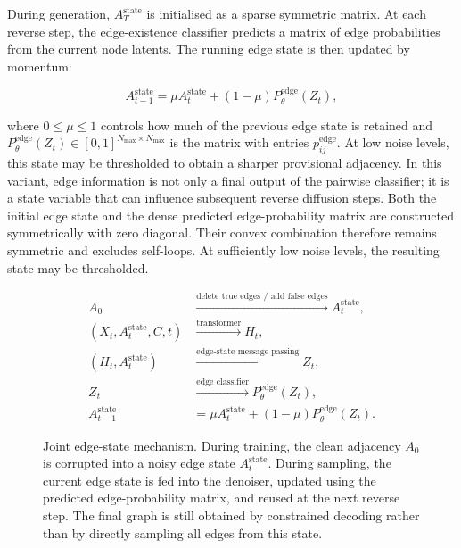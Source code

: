 During generation, \(A_T^{\mathrm{state}}\) is initialised as a sparse symmetric
matrix. At each reverse step, the edge-existence classifier predicts a matrix
of edge probabilities from the current node latents. The running edge state is
then updated by momentum:

\[
    A_{t-1}^{\mathrm{state}}
    =
    \mu A_t^{\mathrm{state}} +
    (1-\mu) P_\theta^{\mathrm{edge}}(Z_t),
\]

where \(0\leq\mu\leq1\) controls how much of the previous edge state is retained
and \(P_\theta^{\mathrm{edge}}(Z_t)\in[0,1]^{N_{\max}\times N_{\max}}\) is the
matrix with entries \(p^{\mathrm{edge}}_{ij}\). At low noise levels, this state
may be thresholded to obtain a sharper provisional adjacency. In this variant,
edge information is not only a final output of the pairwise classifier; it is a
state variable that can influence subsequent reverse diffusion steps.
Both the initial edge state and the dense predicted edge-probability matrix are
constructed symmetrically with zero diagonal. Their convex combination
therefore remains symmetric and excludes self-loops. At sufficiently low noise
levels, the resulting state may be thresholded.


\begin{figure}[H]
    \centering
    \small
    \[
    \begin{aligned}
    A_0
    &\xrightarrow{\text{delete true edges / add false edges}}
    A_t^{\mathrm{state}},
    \\
    (X_t,A_t^{\mathrm{state}},C,t)
    &\xrightarrow{\text{transformer}}
    H_t,
    \\
    (H_t,A_t^{\mathrm{state}})
    &\xrightarrow{\text{edge-state message passing}}
    Z_t,
    \\
    Z_t
    &\xrightarrow{\text{edge classifier}}
    P_\theta^{\mathrm{edge}}(Z_t),
    \\
    A_{t-1}^{\mathrm{state}}
    &=
    \mu A_t^{\mathrm{state}}
    +(1-\mu)P_\theta^{\mathrm{edge}}(Z_t).
    \end{aligned}
    \]
    \caption{
    Joint edge-state mechanism. During training, the clean adjacency \(A_0\) is
    corrupted into a noisy edge state \(A_t^{\mathrm{state}}\). During sampling,
    the current edge state is fed into the denoiser, updated using the predicted
    edge-probability matrix, and reused at the next reverse step. The final
    graph is still obtained by constrained decoding rather than by directly
    sampling all edges from this state.
    }
    \label{fig:generator:joint-edge-state}
\end{figure}

